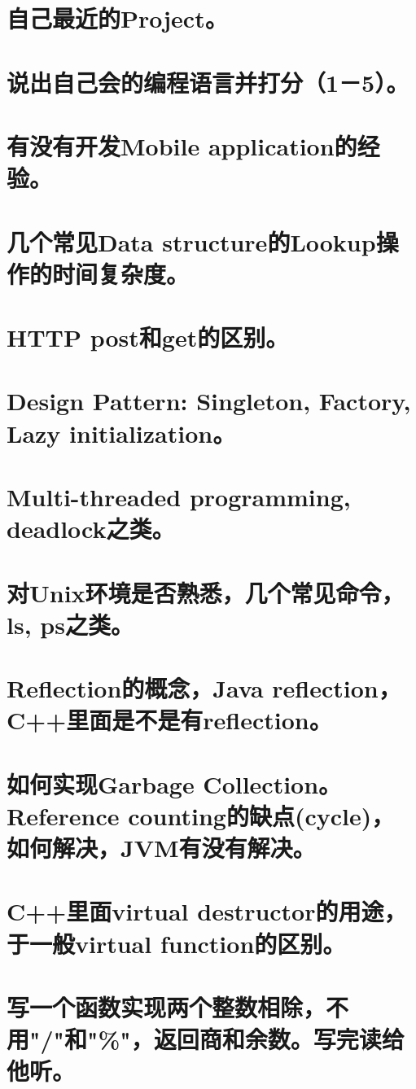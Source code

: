 \documentclass[12pt]{book}
\begin{document}
\section{自己最近的Project。}
\label{sec-18-2}
\section{说出自己会的编程语言并打分（1－5）。}
\label{sec-18-3}
\section{有没有开发Mobile application的经验。}
\label{sec-18-4}
\section{几个常见Data structure的Lookup操作的时间复杂度。}
\label{sec-18-5}
\section{HTTP post和get的区别。}
\label{sec-18-6}
\section{Design Pattern: Singleton, Factory, Lazy initialization。}
\label{sec-18-7}
\section{Multi-threaded programming, deadlock之类。}
\label{sec-18-8}
\section{对Unix环境是否熟悉，几个常见命令，ls, ps之类。}
\label{sec-18-9}
\section{Reflection的概念，Java reflection，C++里面是不是有reflection。}
\label{sec-18-10}
\section{如何实现Garbage Collection。Reference counting的缺点(cycle)，如何解决，JVM有没有解决。}
\label{sec-18-11}
\section{C++里面virtual destructor的用途，于一般virtual function的区别。}
\label{sec-18-12}
\section{写一个函数实现两个整数相除，不用"/"和"\%"，返回商和余数。写完读给他听。}
\label{sec-18-13}
\end{document}
